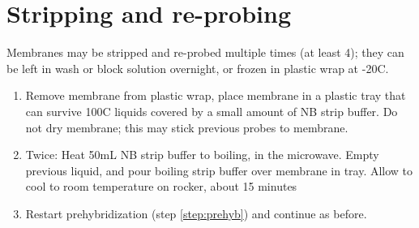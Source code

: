 \documentclass{article}
\begin{document}

\section*{Stripping and re-probing}

Membranes may be stripped and re-probed multiple times (at least 4); they can be left in wash or block solution overnight, or frozen in plastic wrap at -20C.

\begin{enumerate}[resume]
\item Remove membrane from plastic wrap, place membrane in a plastic tray that can survive 100C liquids covered by a small amount of NB strip buffer. Do not dry membrane; this may stick previous probes to membrane.
\item Twice: Heat 50mL NB strip buffer to boiling, in the microwave. Empty previous liquid, and pour boiling strip buffer over membrane in tray. Allow to cool to room temperature on rocker, about 15 minutes
\item Restart prehybridization (step \ref{step:prehyb}) and continue as before.
\end{enumerate}
\end{document}
